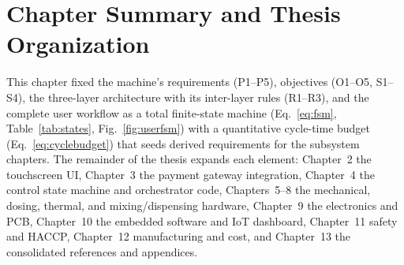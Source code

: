 \section{Chapter Summary and Thesis Organization}
\label{sec:organization}

This chapter fixed the machine's requirements (P1--P5), objectives (O1--O5,
S1--S4), the three-layer architecture with its inter-layer rules (R1--R3),
and the complete user workflow as a total finite-state machine
(Eq.~\ref{eq:fsm}, Table~\ref{tab:states}, Fig.~\ref{fig:userfsm}) with a
quantitative cycle-time budget (Eq.~\ref{eq:cyclebudget}) that seeds derived
requirements for the subsystem chapters. The remainder of the thesis expands
each element: Chapter~2 the touchscreen UI, Chapter~3 the payment gateway
integration, Chapter~4 the control state machine and orchestrator code,
Chapters~5--8 the mechanical, dosing, thermal, and mixing/dispensing
hardware, Chapter~9 the electronics and PCB, Chapter~10 the embedded
software and IoT dashboard, Chapter~11 safety and HACCP, Chapter~12
manufacturing and cost, and Chapter~13 the consolidated references and
appendices.
